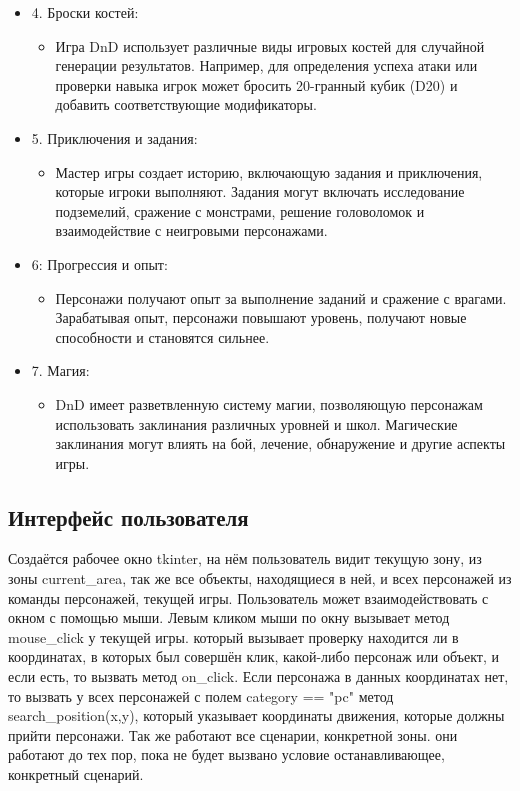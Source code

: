 \begin{itemize}
\begin{itemize}
\begin{itemize}
		\end{itemize}
		\item 4. Броски костей:
		\begin{itemize}
			\item Игра DnD использует различные виды игровых костей для случайной генерации результатов. Например, для определения успеха атаки или проверки навыка игрок может бросить 20-гранный кубик (D20) и добавить соответствующие модификаторы.
		\end{itemize}
		\item 5. Приключения и задания:
		\begin{itemize}
			\item Мастер игры создает историю, включающую задания и приключения, которые игроки выполняют. Задания могут включать исследование подземелий, сражение с монстрами, решение головоломок и взаимодействие с неигровыми персонажами.
		\end{itemize}
		\item 6: Прогрессия и опыт:
		\begin{itemize}
			\item Персонажи получают опыт за выполнение заданий и сражение с врагами. Зарабатывая опыт, персонажи повышают уровень, получают новые способности и становятся сильнее.
		\end{itemize}
		\item 7. Магия:
		\begin{itemize}
			\item DnD имеет разветвленную систему магии, позволяющую персонажам использовать заклинания различных уровней и школ. Магические заклинания могут влиять на бой, лечение, обнаружение и другие аспекты игры.
		\end{itemize}
	\end{itemize}
\end{itemize}

\subsection{Интерфейс пользователя}
Создаётся рабочее окно tkinter, на нём пользователь видит текущую зону, из зоны current\_area, так же все объекты, находящиеся в ней, и всех персонажей из команды персонажей, текущей игры. Пользователь может взаимодействовать с окном с помощью мыши. Левым кликом мыши по окну вызывает метод mouse\_click у текущей игры. который вызывает проверку находится ли в координатах, в которых был совершён клик, какой-либо персонаж или объект, и если есть, то вызвать метод on\_click. Если персонажа в данных координатах нет, то вызвать у всех персонажей с полем category == "pc" метод search\_position(x,y), который указывает координаты движения, которые должны прийти персонажи. Так же работают все сценарии, конкретной зоны. они работают до тех пор, пока не будет вызвано условие останавливающее, конкретный сценарий.
